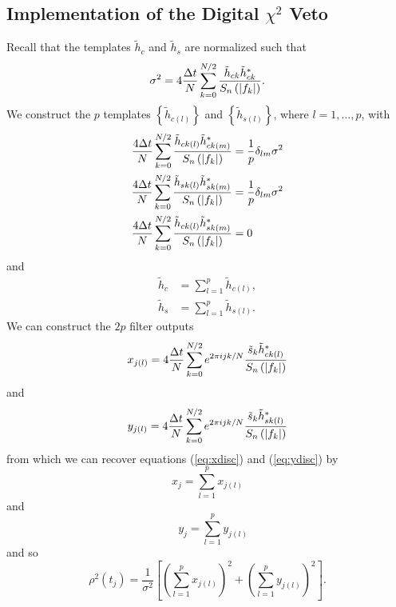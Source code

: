\subsection{Implementation of the Digital $\chi^2$ Veto}
\label{ss:chisqdisc}

Recall that the templates $\tilde{h}_c$ and $\tilde{h}_s$ are normalized such
that
\begin{equation}
\sigma^2 = 4 \frac{\Delta t}{N} \sum_{k=0}^{N/2}
\frac{\tilde{h}_{ck} \tilde{h}_{ck}^\ast } {S_n\left(\left|f_{k}\right|\right)}.
\end{equation}
We construct the $p$ templates $\left\{ \tilde{h}_{c(l)} \right\}$ and 
$\left\{ \tilde{h}_{s(l)} \right\}$, where $l = 1,\ldots,p$, with
\begin{align}
\frac{4\Delta t}{N} \sum_{k=0}^{N/2} 
\frac{\tilde{h}_{ck(l)} \tilde{h}_{ck(m)}^\ast}{S_n\left(\left|f_{k}\right|\right)} &= \frac{1}{p}\delta_{lm}\sigma^2 \\
\frac{4\Delta t}{N} \sum_{k=0}^{N/2} 
\frac{\tilde{h}_{sk(l)} \tilde{h}_{sk(m)}^\ast}{S_n\left(\left|f_{k}\right|\right)} &= \frac{1}{p}\delta_{lm}\sigma^2 \\
\frac{4\Delta t}{N} \sum_{k=0}^{N/2} 
\frac{\tilde{h}_{ck(l)} \tilde{h}_{sk(m)}^\ast}{S_n\left(\left|f_{k}\right|\right)} &= 0
\end{align}
and
\begin{align}
\tilde{h}_{c} &= \sum_{l=1}^{p} \tilde{h}_{c(l)}, \\
\tilde{h}_{s} &= \sum_{l=1}^{p} \tilde{h}_{s(l)}.
\end{align}
We can construct the $2p$ filter outputs
\begin{equation}
x_{j(l)} = 4 \frac{\Delta t}{N} 
   \sum_{k=0}^{N/2} e^{2\pi ijk/N} 
   \frac{\tilde{s}_k \tilde{h}_{ck(l)}^\ast}
        {S_n\left(\left|f_{k}\right|\right)}
\end{equation}
and
\begin{equation}
y_{j(l)} = 4 \frac{\Delta t}{N} 
   \sum_{k=0}^{N/2} e^{2\pi ijk/N} 
   \frac{\tilde{s}_k \tilde{h}_{sk(l)}^\ast}
        {S_n\left(\left|f_{k}\right|\right)}
\end{equation}
from which we can recover equations (\ref{eq:xdisc}) and (\ref{eq:ydisc}) by
\begin{equation}
x_j = \sum_{l = 1}^{p} x_{j(l)}
\end{equation}
and
\begin{equation}
\quad y_j = \sum_{l = 1}^{p} y_{j(l)}
\end{equation}
and so 
\begin{equation}
\rho^2(t_j) = \frac{1}{\sigma^2} \left[ \left( \sum_{l = 1}^{p} x_{j(l)} \right)^2 + \left( \sum_{l = 1}^{p} y_{j(l)} \right )^2 \right].
\end{equation}
